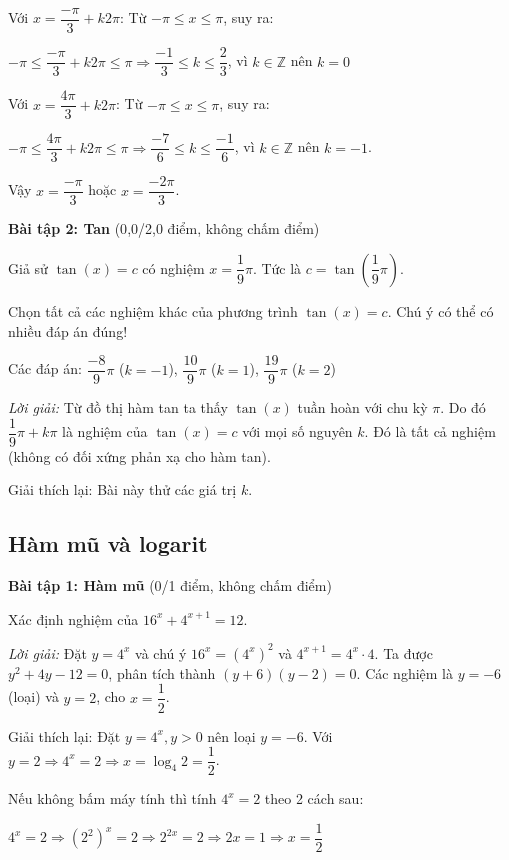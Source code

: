 \documentclass[12pt,a4paper]{article}
\begin{document}
Với $x = \dfrac{-\pi}{3} + k2\pi$: Từ $-\pi \le x \le \pi$, suy ra:

$-\pi \le \dfrac{-\pi}{3} + k2\pi \le \pi \Rightarrow \dfrac{-1}{3} \le k \le \dfrac{2}{3}$, vì $k \in \mathbb{Z}$ nên $k = 0$

Với $x = \dfrac{4\pi}{3} + k2\pi$: Từ $-\pi \le x \le \pi$, suy ra:

$-\pi \le \dfrac{4\pi}{3} + k2\pi \le \pi \Rightarrow \dfrac{-7}{6} \le k \le \dfrac{-1}{6}$, vì $k \in \mathbb{Z}$ nên $k = -1$.

Vậy $x = \dfrac{-\pi}{3}$ hoặc $x = \dfrac{-2\pi}{3}$.

\textbf{Bài tập 2: Tan} (0{,}0/2{,}0 điểm, không chấm điểm)

Giả sử $\tan(x) = c$ có nghiệm $x = \dfrac{1}{9}\pi$. Tức là $c = \tan(\dfrac{1}{9}\pi)$.

Chọn tất cả các nghiệm khác của phương trình $\tan(x) = c$. Chú ý có thể có nhiều đáp án đúng!

Các đáp án: $\dfrac{-8}{9}\pi$ ($k = -1$), $\dfrac{10}{9}\pi$ ($k = 1$), $\dfrac{19}{9}\pi$ ($k = 2$)

\textit{Lời giải:} Từ đồ thị hàm tan ta thấy $\tan(x)$ tuần hoàn với chu kỳ $\pi$. Do đó $\dfrac{1}{9}\pi + k\pi$ là nghiệm của $\tan(x) = c$ với mọi số nguyên $k$. Đó là tất cả nghiệm (không có đối xứng phản xạ cho hàm tan).

Giải thích lại: Bài này thử các giá trị $k$.

\subsection{Hàm mũ và logarit}

\textbf{Bài tập 1: Hàm mũ} (0/1 điểm, không chấm điểm)

Xác định nghiệm của $16^x + 4^{x+1} = 12$.

\textit{Lời giải:} Đặt $y = 4^x$ và chú ý $16^x = (4^x)^2$ và $4^{x+1} = 4^x \cdot 4$. Ta được $y^2 + 4y - 12 = 0$, phân tích thành $(y+6)(y-2) = 0$. Các nghiệm là $y = -6$ (loại) và $y = 2$, cho $x = \dfrac{1}{2}$.

Giải thích lại: Đặt $y = 4^x, y > 0$ nên loại $y = -6$. Với $y = 2 \Rightarrow 4^x = 2 \Rightarrow x = \log_4{2} = \dfrac{1}{2}$.

Nếu không bấm máy tính thì tính $4^x = 2$ theo 2 cách sau:

$4^x = 2 \Rightarrow (2^2)^x = 2 \Rightarrow 2^{2x} = 2 \Rightarrow 2x = 1 \Rightarrow x = \dfrac{1}{2}$
\end{document}
